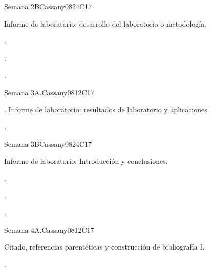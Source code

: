 \begin{syllabus}
\begin{unit}{Semana 2B}{}{Cassany08}{24}{C17}
   \begin{topics}
      \item Informe de laboratorio: desarrollo del laboratorio o metodología.
   \end{topics}

   \begin{learningoutcomes}
      \item . 
      \item .
      \item . 
      \end{learningoutcomes}
\end{unit}

\begin{unit}{Semana 3A.}{}{Cassany08}{12}{C17}
   \begin{topics}
      \item . Informe de laboratorio: resultados de laboratorio y aplicaciones. 
   \end{topics}
   \begin{learningoutcomes}
      \item . 
   \end{learningoutcomes}
\end{unit}

\begin{unit}{Semana 3B}{}{Cassany08}{24}{C17}
   \begin{topics}
      \item Informe de laboratorio: Introducción y conclusiones. 
   \end{topics}

   \begin{learningoutcomes}
      \item . 
      \item .
      \item . 
      \end{learningoutcomes}
\end{unit}

\begin{unit}{Semana 4A.}{}{Cassany08}{12}{C17}
   \begin{topics}
      \item Citado, referencias parentéticas y construcción de bibliografía I. 
   \end{topics}
   \begin{learningoutcomes}
      \item . 
   \end{learningoutcomes}
\end{unit}


\end{syllabus}
